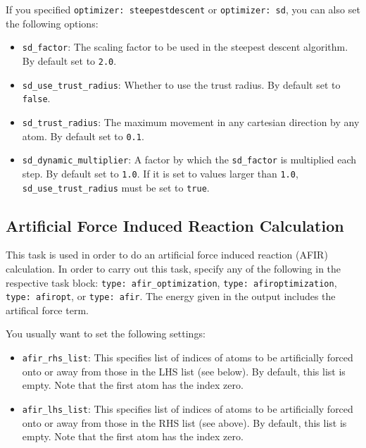 \documentclass[]{tufte-book}
\begin{document}
If you specified \texttt{optimizer: steepestdescent} or \texttt{optimizer: sd}, you can also set the following options:
\begin{itemize}
\item \texttt{sd\_factor}: The scaling factor to be used in the steepest descent algorithm. By default set to \texttt{2.0}.
\item \texttt{sd\_use\_trust\_radius}: Whether to use the trust radius. By default set to \texttt{false}.
\item \texttt{sd\_trust\_radius}: The maximum movement in any cartesian direction by any atom. By default set to \texttt{0.1}.
\item \texttt{sd\_dynamic\_multiplier}: A factor by which the \texttt{sd\_factor} is multiplied each step. By default set to \texttt{1.0}.
If it is set to values larger than \texttt{1.0}, \texttt{sd\_use\_trust\_radius} must be set to \texttt{true}.
\end{itemize}

\subsection{Artificial Force Induced Reaction Calculation}

This task is used in order to do an artificial force induced reaction (AFIR\cite{afir1, afir2}) calculation. In
order to carry out this task, specify any of the following in the respective task block: \texttt{type: afir\_optimization},
\texttt{type: afiroptimization}, \texttt{type: afiropt}, or \texttt{type: afir}. The energy given in the output
includes the artifical force term.

You usually want to set the following settings:
\begin{itemize}
\item \texttt{afir\_rhs\_list}: This specifies list of indices of atoms to be artificially forced onto or away from those
in the LHS list (see below). By default, this list is empty. Note that the first atom has the index zero.
\item \texttt{afir\_lhs\_list}: This specifies list of indices of atoms to be artificially forced onto or away from those
in the RHS list (see above). By default, this list is empty. Note that the first atom has the index zero.
\end{itemize}
\end{document}
